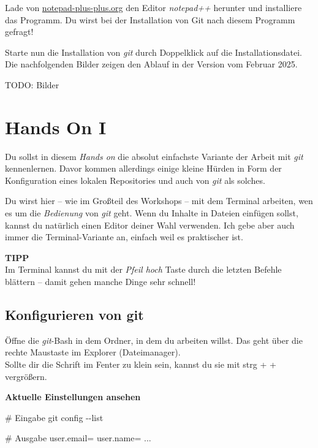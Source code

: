 \documentclass[
  letterpaper,
  DIV=11]{scrreprt}
\newenvironment{Shaded}{\begin{snugshade}}{\end{snugshade}}
\newcommand{\AttributeTok}[1]{\textcolor[rgb]{0.40,0.45,0.13}{#1}}
\newcommand{\CommentTok}[1]{\textcolor[rgb]{0.37,0.37,0.37}{#1}}
\newcommand{\ExtensionTok}[1]{\textcolor[rgb]{0.00,0.23,0.31}{#1}}
\newcommand{\FunctionTok}[1]{\textcolor[rgb]{0.28,0.35,0.67}{#1}}
\newcommand{\NormalTok}[1]{\textcolor[rgb]{0.00,0.23,0.31}{#1}}
\newcommand{\git}{\textit{git}\xspace}
\newcommand{\strg}[1]{strg + #1\xspace}
\begin{document}
Lade von
\href{https://notepad-plus-plus.org/downloads/}{notepad-plus-plus.org}
den Editor \emph{notepad++} herunter und installiere das Programm. Du
wirst bei der Installation von Git nach diesem Programm gefragt!

Starte nun die Installation von \git durch Doppelklick auf die
Installationsdatei. Die nachfolgenden Bilder zeigen den Ablauf in der
Version vom Februar 2025.

TODO: Bilder


\chapter{Hands On I}\label{hands-on-i}

Du sollst in diesem \emph{Hands on} die absolut einfachste Variante der
Arbeit mit \git kennenlernen. Davor kommen allerdings einige kleine
Hürden in Form der Konfiguration eines lokalen Repositories und auch von
\git als solches.

Du wirst hier -- wie im Großteil des Workshops -- mit dem Terminal
arbeiten, wen es um die \emph{Bedienung} von \git geht. Wenn du Inhalte
in Dateien einfügen sollst, kannst du natürlich einen Editor deiner Wahl
verwenden. Ich gebe aber auch immer die Terminal-Variante an, einfach
weil es praktischer ist.

\samplestart

\textbf{TIPP}\\
Im Terminal kannst du mit der \emph{Pfeil hoch} Taste durch die letzten
Befehle blättern -- damit gehen manche Dinge sehr schnell! \sampleend

\section{Konfigurieren von git}\label{konfigurieren-von-git}

Öffne die \git-Bash in dem Ordner, in dem du arbeiten willst. Das geht
über die rechte Maustaste im Explorer (Dateimanager).\\
Sollte dir die Schrift im Fenter zu klein sein, kannst du sie mit
\strg{+} vergrößern.

\textbf{Aktuelle Einstellungen ansehen}

\begin{Shaded}
\begin{Highlighting}[]
\CommentTok{\# Eingabe}
\FunctionTok{git}\NormalTok{ config }\AttributeTok{{-}{-}list}

\CommentTok{\# Ausgabe}
\ExtensionTok{user.email=}
\ExtensionTok{user.name=}
     \ExtensionTok{...}
\end{Highlighting}
\end{Shaded}
\end{document}
